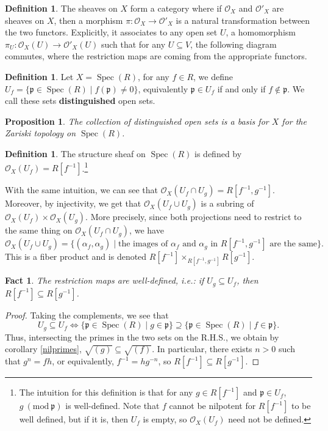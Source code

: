\documentclass{tufte-handout} %
\newtheorem{prop}[thm]{Proposition}
\newtheorem{fact}[thm]{Fact}
\theoremstyle{definition}
\newtheorem{defn}[thm]{Definition}
\theoremstyle{remark}
\newcommand{\Mod}[1]{\ (\text{mod}\ #1)}
\newcommand{\mO}{\mathcal{O}}
\newcommand{\lp}{{\mathfrak{p}}}
\DeclareMathOperator{\spec}{Spec}
\begin{document}
\begin{defn}
	The sheaves on $X$ form a category where if $\mO_X$ and $\mO'_X$ are sheaves on $X$, then a morphism $\pi: \mO_X \rightarrow \mO'_X$ is a natural transformation between the two functors. Explicitly, it associates to any open set $U$, a homomorphism $\pi_U : \mO_X(U) \rightarrow \mO'_X(U)$ such that for any $U \subseteq V$, the following diagram commutes, where the restriction maps are coming from the appropriate functors.
	\begin{figure}[h]%
		\centering
	\end{figure}
\end{defn}

\begin{defn}
	Let $X = \spec(R)$, for any $f \in R$, we define $U_f = \{\lp \in \spec(R) \mid f(\lp) \neq 0\}$, equivalently $\lp \in U_f$ if and only if $f \notin \lp$. We call these sets \textbf{distinguished} open sets.
\end{defn}
\begin{prop}
	The collection of distinguished open sets is a basis for $X$ for the Zariski topology on $\spec(R)$.%
\end{prop}

\begin{defn}
	The structure sheaf on $\spec(R)$ is defined by $\mO_X(U_f) = R[f^{-1}]$.\footnote{The intuition for this definition is that for any $g \in R[f^{-1}]$ and $\lp \in U_f$, $g \Mod{\lp}$ is well-defined. Note that $f$ cannot be nilpotent for $R[f^{-1}]$ to be well defined, but if it is, then $U_f$ is empty, so $\mO_X(U_f)$ need not be defined.}
\end{defn}
With the same intuition, we can see that $\mO_X(U_f \cap U_g) = R[f^{-1}, g^{-1}]$. Moreover, by injectivity, we get that $\mO_X(U_f \cup U_g)$ is a subring of $\mO_X(U_f) \times \mO_X(U_g)$. More precisely, since both projections need to restrict to the same thing on $\mO_X(U_f \cap U_g)$, we have
\[\mO_X(U_f \cup U_g) = \{(\alpha_f, \alpha_g) \mid \text{the images of $\alpha_f$ and $\alpha_g$ in $R[f^{-1}, g^{-1}]$ are the same}\}.\]
This is a fiber product and is denoted $R[f^{-1}] \times_{R[f^{-1},g^{-1}]} R[g^{-1}]$.
\begin{fact}
	The restriction maps are well-defined, i.e.: if $U_g \subseteq U_f$, then $R[f^{-1}] \subseteq R[g^{-1}]$.
\end{fact}
\begin{proof}
	Taking the complements, we see that \[U_g \subseteq U_f \Leftrightarrow \{\lp \in \spec(R) \mid g \in \lp\} \supseteq \{\lp \in \spec(R) \mid f \in \lp\}.\] Thus, intersecting the primes in the two sets on the R.H.S., we obtain by corollary \ref{nilprimes}, $\sqrt{(g)} \subseteq \sqrt{(f)}$. In particular, there exists $n>0$ such that $g^n = fh$, or equivalently, $f^{-1} = hg^{-n}$, so $R[f^{-1}] \subseteq R[g^{-1}]$.
\end{proof}
\end{document}

